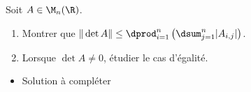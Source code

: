 \begin{enonce}
\begin{exercise}[ID={RMS134 E575},subtitle={Oral
    Mines-Ponts},theme={algebre},annee={2023},concours={mines-ponts},filiere={MP}]
  Soit $A\in\M_n(\R)$.
  \begin{enumerate}
  \item Montrer que $\|\det
    A\|\le\dprod_{i=1}^n\left(\dsum_{j=1}^n|A_{i,j}|\right)$.
  \item Lorsque $\det A\neq 0$, étudier le cas d'égalité.
  \end{enumerate}
\end{exercise}
\begin{solution}
  \begin{itemize}
  \item Solution à compléter
  \end{itemize}
\end{solution}
\end{enonce}